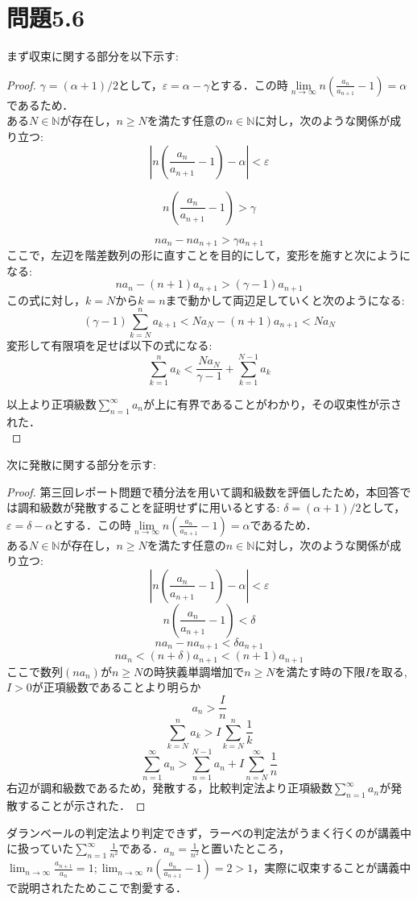 \documentclass{jarticle}
\begin{document}
\section*{問題5.6}
まず収束に関する部分を以下示す:
\begin{proof}
	$\gamma = (\alpha +1)/2$として，$\varepsilon = \alpha - \gamma$とする．この時$\lim\limits_{n \to \infty} n \left( \frac{a_n}{a_{n+1}} -1 \right) = \alpha$であるため．\\
	ある$N \in \mathbb{N}$が存在し，$ n \ge N$を満たす任意の$ n \in \mathbb{N}$に対し，次のような関係が成り立つ:\\
			$$
			\left| n \left(\frac{a_n}{a_{n+1}}-1 \right) - \alpha \right|  <  \varepsilon 
			$$

			$$
			n \left(\frac{a_n}{a_{n+1}}-1 \right)  >  \gamma
			$$

			$$
			na_n-na_{n+1} > \gamma a_{n+1} 
			$$
			ここで，左辺を階差数列の形に直すことを目的にして，変形を施すと次にようになる:\\
			$$
			na_n - (n+1)a_{n+1}  >  ( \gamma -1 ) a_{n+1}
			$$
			この式に対し，$k=N$から$k=n$まで動かして両辺足していくと次のようになる:\\
			$$
			(\gamma -1) \sum_{k=N}^{n}a_{k+1} <Na_N - (n+1)a_{n+1}<Na_N
			$$
			変形して有限項を足せば以下の式になる:\\
			$$
			\sum_{k=1}^{n}a_k < \frac{Na_N}{\gamma -1} + \sum_{k=1}^{N-1}a_k
			$$
	
	以上より正項級数$\sum\limits_{n=1}^{\infty}a_n$が上に有界であることがわかり，その収束性が示された．\\
\end{proof}
次に発散に関する部分を示す:
\begin{proof}
第三回レポート問題で積分法を用いて調和級数を評価したため，本回答では調和級数が発散することを証明せずに用いるとする:
	$\delta = (\alpha +1)/2$として，$\varepsilon = \delta - \alpha$とする．この時$\lim\limits_{n \to \infty} n \left( \frac{a_n}{a_{n+1}} -1 \right) = \alpha$であるため．\\
        ある$N \in \mathbb{N}$が存在し，$ n \ge N$を満たす任意の$ n \in \mathbb{N}$に対し，次のような関係が成り立つ:\\
			$$
			\left| n \left(\frac{a_n}{a_{n+1}}-1 \right) - \alpha \right|  <  \varepsilon 
			$$
			$$
			n \left(\frac{a_n}{a_{n+1}}-1 \right) <  \delta 
			$$
			$$
			na_n - n a_{n+1}  <  \delta a_{n+1} 
			$$
			$$
			na_n<(n+\delta)a_{n+1}<(n+1)a_{n+1}
			$$
			ここで数列$(na_n)$が$n \ge N$の時狭義単調増加で$n \ge N$を満たす時の下限$I$を取る, $I > 0$が正項級数であることより明らか
			$$
			a_n > \frac{I}{n}
			$$
			$$
			\sum_{k=N}^{n} a_k > I \sum_{k=N}^{n}\frac{1}{k}
			$$
			$$
			\sum_{n=1}^{\infty} a_n > \sum_{n=1}^{N-1}a_n + I \sum_{n=N}^{\infty} \frac{1}{n}
			$$
	右辺が調和級数であるため，発散する，比較判定法より正項級数$\sum\limits_{n=1}^{\infty}a_n$が発散することが示された．
\end{proof}
ダランベールの判定法より判定できず，ラーベの判定法がうまく行くのが講義中に扱っていた$\sum_{n=1}^{\infty} \frac{1}{n^2}$である．$a_n = \frac{1}{n^2}$と置いたところ，
$\lim_{n \to \infty}\frac{a_{n+1}}{a_{n}}=1; \lim_{n \to \infty}n \left(\frac{a_n}{a_{n+1}}-1 \right) =2>1$，実際に収束することが講義中で説明されたためここで割愛する．
\\
\end{document}
